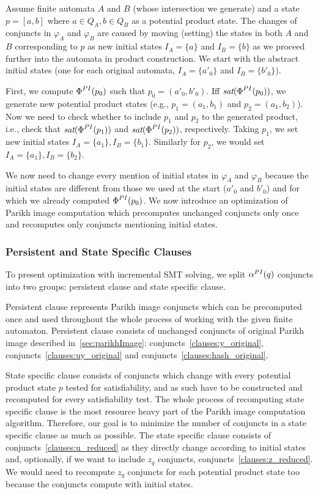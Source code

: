 Assume finite automata $A$ and $B$ (whose intersection we generate) and a state $p = [a, b]$ where $a \in Q_A, b \in Q_B$ as a potential product state. The changes of conjuncts in $\varphi_A$ and $\varphi_B$ are caused by moving (setting) the states in both $A$ and $B$ corresponding to $p$ as new initial states $I_A = \{a\}$ and $I_B = \{b\}$ as we proceed further into the automata in product construction. We start with the abstract initial states (one for each original automata, $I_A = \{a'_0\}$ and $I_B = \{b'_0\}$).

First, we compute $\emph{$\Phi$}^{PI}(p_0)$ such that $p_0 = (a'_0,b'_0)$. Iff $\emph{sat}(\emph{$\Phi$}^{PI}(p_0))$, we generate new potential product states (e.g., $p_1 = (a_1, b_1)$ and $p_2 = (a_1, b_2)$). Now we need to check whether to include $p_1$ and $p_2$ to the generated product, i.e., check that $\emph{sat}(\emph{$\Phi$}^{PI}(p_1))$ and $\emph{sat}(\emph{$\Phi$}^{PI}(p_2))$, respectively. Taking $p_1$, we set new initial states $I_A = \{a_1\}, I_B = \{b_1\}$. Similarly for $p_2$, we would set $I_A = \{a_1\}, I_B = \{b_2\}$.

We now need to change every mention of initial states in $\varphi_A$ and $\varphi_B$ because the initial states are different from those we used at the start ($a'_0$ and $b'_0$) and for which we already computed $\emph{$\Phi$}^{PI}(p_0)$. We now introduce an optimization of Parikh image computation which precomputes unchanged conjuncts only once and recomputes only conjuncts mentioning initial states.

\subsubsection{Persistent and State Specific Clauses}

To present optimization with incremental SMT solving, we split $\alpha^{PI}(q)$ conjuncts into two groups: persistent clause and state specific clause.

Persistent clause represents Parikh image conjuncts which can be precomputed once and used throughout the whole process of working with the given finite automaton. Persistent clause consists of unchanged conjuncts of original Parikh image described in~\ref{sec:parikhImage}: conjuncts~\ref{clauses:y_original}, conjuncts~\ref{clauses:uy_original} and conjuncts~\ref{clauses:hash_original}.

State specific clause consists of conjuncts which change with every potential product state $p$ tested for satisfiability, and as such have to be constructed and recomputed for every satisfiability test. The whole process of recomputing state specific clause is the most resource heavy part of the Parikh image computation algorithm. Therefore, our goal is to minimize the number of conjuncts in a state specific clause as much as possible. The state specific clause consists of conjuncts~\ref{clauses:u_reduced} as they directly change according to initial states and, optionally, if we want to include $z_{q}$ conjuncts, conjuncts~\ref{clauses:z_reduced}. We would need to recompute $z_{q}$ conjuncts for each potential product state too because the conjuncts compute with initial states.

